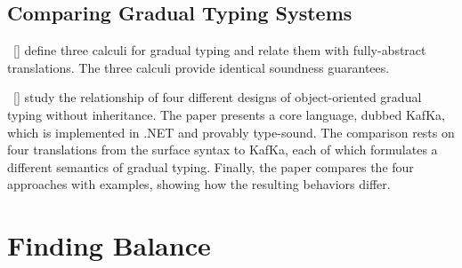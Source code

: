\documentclass[screen=true, 10pt, acmsmall]{acmart}
\makeatletter
\newcommand{\sectionNewpage}{}
\newcommand{\Sendabbrev}[1]{#1\@}
\let\SOriginalthesubsection\thesubsection
\let\SOriginalthesubsubsection\thesubsubsection
\newcommand{\Ssection}[2]{\section[#1]{#2}\let\thesubsection\SOriginalthesubsection}
\newcommand{\Ssubsection}[2]{\subsection[#1]{#2}\let\thesubsubsection\SOriginalthesubsubsection}
\newcommand{\AutobibLink}[1]{\color{ACMPurple}{#1}}
\newcommand{\Autobibref}[1]{#1}
\providecommand{\AutobibLink}[1]{#1}
\makeatother
\begin{document}
\Ssubsection{Comparing Gradual Typing Systems}{Comparing Gradual Typing Systems}\label{t:x28part_x22Comparingx5fGradualx5fTypingx5fSystemsx22x29}

\Autobibref{\hyperref[t:x28autobib_x22Jeremy_Siekx2c_Peter_Thiemannx2c_and_Philip_WadlerBlame_and_Coercionx3a_Together_Again_for_the_First_TimeConference_on_Programming_Language_Design_and_Implementationx2c_ppx2e_425x2dx2d4352015x22x29]{\AutobibLink{Siek et al\Sendabbrev{.}}}~[\hyperref[t:x28autobib_x22Jeremy_Siekx2c_Peter_Thiemannx2c_and_Philip_WadlerBlame_and_Coercionx3a_Together_Again_for_the_First_TimeConference_on_Programming_Language_Design_and_Implementationx2c_ppx2e_425x2dx2d4352015x22x29]{\AutobibLink{2015\AutobibLink{a}}}]} define three calculi for gradual typing and relate them with
 fully{-}abstract translations.
The three calculi provide identical soundness guarantees.

\Autobibref{\hyperref[t:x28autobib_x22Benjamin_Wx2e_Chungx2c_Paley_Lix2c_Francesco_Zappa_Nardellix2c_and_Jan_VitekA_Framework_for_Objectx2dOriented_Gradual_TypingTo_appear_in_European_Conference_on_Objectx2dOriented_Programming2018x22x29]{\AutobibLink{Chung et al\Sendabbrev{.}}}~[\hyperref[t:x28autobib_x22Benjamin_Wx2e_Chungx2c_Paley_Lix2c_Francesco_Zappa_Nardellix2c_and_Jan_VitekA_Framework_for_Objectx2dOriented_Gradual_TypingTo_appear_in_European_Conference_on_Objectx2dOriented_Programming2018x22x29]{\AutobibLink{2018}}]} study the relationship of four different designs of
object{-}oriented gradual typing without inheritance.
The paper presents a core language, dubbed
KafKa, which is implemented in .NET and provably type{-}sound.  The
comparison rests on four translations from the surface syntax to KafKa,
each of which formulates a different semantics of gradual typing.  Finally,
the paper compares the four approaches with examples, showing how the
resulting behaviors differ.

\sectionNewpage

\Ssection{Finding Balance}{Finding Balance}\label{t:x28part_x22secx3aconclusionx22x29}
\end{document}
